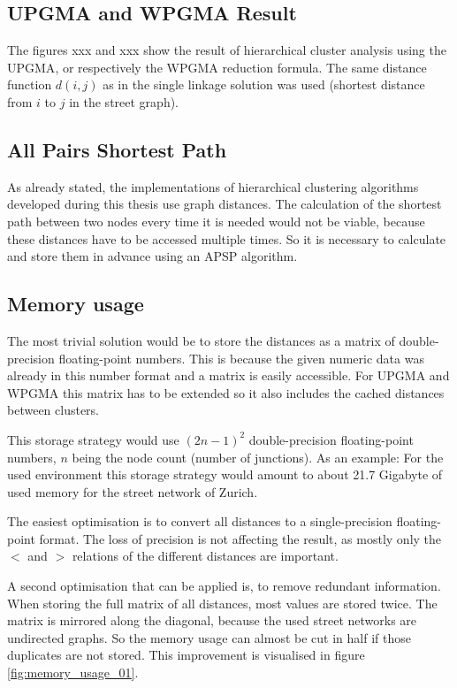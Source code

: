 \subsection{UPGMA and WPGMA Result}
\label{sec:UPGMAandWPGMA}
The figures xxx and xxx show the result of hierarchical cluster analysis using the \acrshort{UPGMA}, or respectively the \acrshort{WPGMA} reduction formula. The same distance function $d(i, j)$ as in the single linkage solution was used (shortest distance from $i$ to $j$ in the street graph).

\subsection{All Pairs Shortest Path} \label{sec:shortest_path}
As already stated, the implementations of hierarchical clustering algorithms developed during this thesis use graph distances. The calculation of the shortest path between two nodes every time it is needed would not be viable, because these distances have to be accessed multiple times. So it is necessary to calculate and store them in advance using an \gls{APSP} algorithm.

\subsection{Memory usage} \label{sec:memory_usage}
The most trivial solution would be to store the distances as a matrix of double-precision floating-point numbers. This is because the given numeric data was already in this number format and a matrix is easily accessible. For \acrshort{UPGMA} and \acrshort{WPGMA} this matrix has to be extended so it also includes the cached distances between clusters.

This storage strategy would use $(2n-1)^2$ double-precision floating-point numbers, $n$ being the node count (number of junctions). As an example: For the used environment this storage strategy would amount to about 21.7 Gigabyte of used memory for the street network of Zurich.

The easiest optimisation is to convert all distances to a single-precision floating-point format. The loss of precision is not affecting the result, as mostly only the $<$ and $>$ relations of the different distances are important.

A second optimisation that can be applied is, to remove redundant information. When storing the full matrix of all distances, most values are stored twice. The matrix is mirrored along the diagonal, because the used street networks are undirected graphs. So the memory usage can almost be cut in half if those duplicates are not stored. This improvement is visualised in figure \ref{fig:memory_usage_01}.

